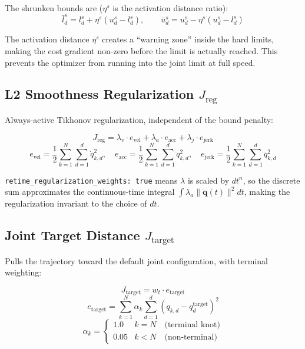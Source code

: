 \documentclass[11pt,a4paper]{article}
\begin{document}
The shrunken bounds are ($\eta^s$ is the activation distance ratio):
%
\begin{equation}
\bar{l}_d^s = l_d^s + \eta^s (u_d^s - l_d^s), \qquad
\bar{u}_d^s = u_d^s - \eta^s (u_d^s - l_d^s)
\end{equation}

The activation distance $\eta^s$ creates a ``warning zone'' inside the hard limits,
making the cost gradient non-zero before the limit is actually reached. This prevents
the optimizer from running into the joint limit at full speed.

\subsection{L2 Smoothness Regularization $J_{\text{reg}}$}

Always-active Tikhonov regularization, independent of the bound penalty:

\begin{equation}
J_{\text{reg}} = \lambda_v \cdot e_{\text{vel}} + \lambda_a \cdot e_{\text{acc}} + \lambda_j \cdot e_{\text{jerk}}
\label{eq:reg}
\end{equation}
%
\begin{equation}
e_{\text{vel}} = \frac{1}{2} \sum_{k=1}^{N} \sum_{d=1}^{d} \dot{q}_{k,d}^2, \quad
e_{\text{acc}} = \frac{1}{2} \sum_{k=1}^{N} \sum_{d=1}^{d} \ddot{q}_{k,d}^2, \quad
e_{\text{jerk}} = \frac{1}{2} \sum_{k=1}^{N} \sum_{d=1}^{d} \dddot{q}_{k,d}^2
\label{eq:ereg}
\end{equation}

\texttt{retime\_regularization\_weights: true} means $\lambda$ is scaled by $dt^n$, so
the discrete sum approximates the continuous-time integral
$\int \lambda_a \lVert\ddot{\mathbf{q}}(t)\rVert^2 dt$, making the regularization
invariant to the choice of $dt$.

\subsection{Joint Target Distance $J_{\text{target}}$}

Pulls the trajectory toward the default joint configuration, with terminal weighting:

\begin{equation}
J_{\text{target}} = w_t \cdot e_{\text{target}}
\label{eq:target}
\end{equation}
%
\begin{equation}
e_{\text{target}} = \sum_{k=1}^{N} \alpha_k \sum_{d=1}^{d} (q_{k,d} - q_d^{\text{target}})^2
\label{eq:etarget}
\end{equation}
%
\begin{equation}
\alpha_k = \begin{cases}
1.0  & k = N \quad \text{(terminal knot)} \\
0.05 & k < N \quad \text{(non-terminal)}
\end{cases}
\end{equation}
\end{document}
